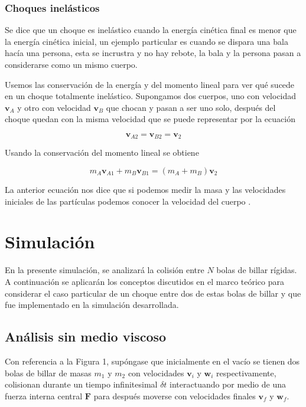 \documentclass{article}
\begin{document}
\subsubsection{Choques inelásticos}
Se dice que un choque es inelástico cuando la energía  cinética final es menor que la energía cinética inicial, un ejemplo particular es cuando se dispara una bala hacía una persona, esta se incrustra y no hay rebote, la bala y la persona pasan a considerarse como un mismo cuerpo.

Usemos las conservación de la energía y del momento lineal para ver qué sucede en un choque totalmente inelástico. Supongamos dos cuerpos, uno con velocidad $\textbf{v}_{A}$  y otro con velocidad $\textbf{v}_{B}$ que chocan y pasan a ser uno solo, después del choque quedan con la misma velocidad que se puede representar por la ecuación  

\begin{equation}
   \textbf{v}_{A2}=\textbf{v}_{B2} = \textbf{v}_{2}
\end{equation}

Usando la conservación del momento lineal se obtiene

\begin{equation}
  m_{A} \textbf{v}_{A1} + m_{B} \textbf{v}_{B1} = (m_{A} + m_{B})\textbf{v}_{2}
\end{equation}

La anterior ecuación nos dice que si podemos medir la masa y las velocidades iniciales de las partículas podemos conocer la velocidad del cuerpo .


\section{Simulación}

En la presente simulación, se analizará la colisión entre $N$ bolas de billar rígidas. A continuación se aplicarán los conceptos discutidos en el marco teórico para considerar el caso particular de un choque entre dos de estas bolas de billar y que fue implementado en la simulación desarrollada.

\subsection{Análisis sin medio viscoso}
Con referencia a la Figura 1, supóngase que inicialmente en el vacío se tienen dos bolas de billar de masas $m_1$ y $m_2$ con velocidades $\textbf{v}_{i}$ y $\textbf{w}_{i}$ respectivamente, colisionan durante un tiempo infinitesimal $\delta t$ interactuando por medio de una fuerza interna central $\textbf{F}$ para después moverse con velocidades finales $\textbf{v}_{f}$ y $\textbf{w}_{f}$.
\end{document}
